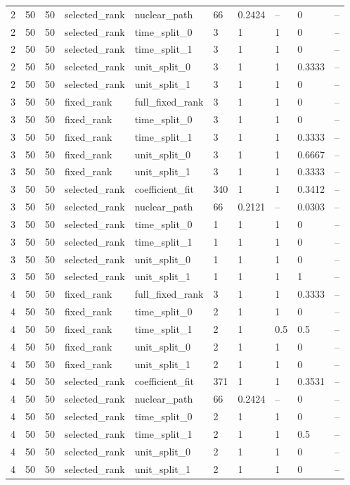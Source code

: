 \begin{longtable}{llllllllll}
2 & 50 & 50 & selected\_rank & nuclear\_path & 66 & 0.2424 & -- & 0 & -- \\
2 & 50 & 50 & selected\_rank & time\_split\_0 & 3 & 1 & 1 & 0 & -- \\
2 & 50 & 50 & selected\_rank & time\_split\_1 & 3 & 1 & 1 & 0 & -- \\
2 & 50 & 50 & selected\_rank & unit\_split\_0 & 3 & 1 & 1 & 0.3333 & -- \\
2 & 50 & 50 & selected\_rank & unit\_split\_1 & 3 & 1 & 1 & 0 & -- \\
3 & 50 & 50 & fixed\_rank & full\_fixed\_rank & 3 & 1 & 1 & 0 & -- \\
3 & 50 & 50 & fixed\_rank & time\_split\_0 & 3 & 1 & 1 & 0 & -- \\
3 & 50 & 50 & fixed\_rank & time\_split\_1 & 3 & 1 & 1 & 0.3333 & -- \\
3 & 50 & 50 & fixed\_rank & unit\_split\_0 & 3 & 1 & 1 & 0.6667 & -- \\
3 & 50 & 50 & fixed\_rank & unit\_split\_1 & 3 & 1 & 1 & 0.3333 & -- \\
3 & 50 & 50 & selected\_rank & coefficient\_fit & 340 & 1 & 1 & 0.3412 & -- \\
3 & 50 & 50 & selected\_rank & nuclear\_path & 66 & 0.2121 & -- & 0.0303 & -- \\
3 & 50 & 50 & selected\_rank & time\_split\_0 & 1 & 1 & 1 & 0 & -- \\
3 & 50 & 50 & selected\_rank & time\_split\_1 & 1 & 1 & 1 & 0 & -- \\
3 & 50 & 50 & selected\_rank & unit\_split\_0 & 1 & 1 & 1 & 0 & -- \\
3 & 50 & 50 & selected\_rank & unit\_split\_1 & 1 & 1 & 1 & 1 & -- \\
4 & 50 & 50 & fixed\_rank & full\_fixed\_rank & 3 & 1 & 1 & 0.3333 & -- \\
4 & 50 & 50 & fixed\_rank & time\_split\_0 & 2 & 1 & 1 & 0 & -- \\
4 & 50 & 50 & fixed\_rank & time\_split\_1 & 2 & 1 & 0.5 & 0.5 & -- \\
4 & 50 & 50 & fixed\_rank & unit\_split\_0 & 2 & 1 & 1 & 0 & -- \\
4 & 50 & 50 & fixed\_rank & unit\_split\_1 & 2 & 1 & 1 & 0 & -- \\
4 & 50 & 50 & selected\_rank & coefficient\_fit & 371 & 1 & 1 & 0.3531 & -- \\
4 & 50 & 50 & selected\_rank & nuclear\_path & 66 & 0.2424 & -- & 0 & -- \\
4 & 50 & 50 & selected\_rank & time\_split\_0 & 2 & 1 & 1 & 0 & -- \\
4 & 50 & 50 & selected\_rank & time\_split\_1 & 2 & 1 & 1 & 0.5 & -- \\
4 & 50 & 50 & selected\_rank & unit\_split\_0 & 2 & 1 & 1 & 0 & -- \\
4 & 50 & 50 & selected\_rank & unit\_split\_1 & 2 & 1 & 1 & 0 & -- \\
\bottomrule
\end{longtable}
\endgroup
